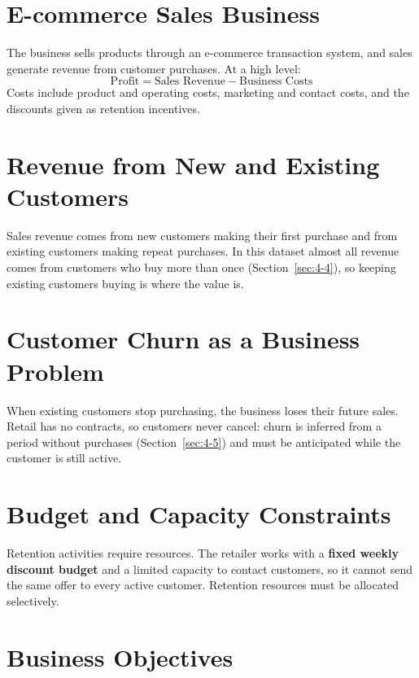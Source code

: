 \section{E-commerce Sales Business}
\label{sec:2-1}

The business sells products through an e-commerce transaction system, and sales generate revenue from customer purchases. At a high level:
\begin{equation*}
    \text{Profit} = \text{Sales Revenue} - \text{Business Costs}
\end{equation*}
Costs include product and operating costs, marketing and contact costs, and the discounts given as retention incentives.

\section{Revenue from New and Existing Customers}
\label{sec:2-2}

Sales revenue comes from new customers making their first purchase and from existing customers making repeat purchases. In this dataset almost all revenue comes from customers who buy more than once (Section~\ref{sec:4-4}), so keeping existing customers buying is where the value is.

\section{Customer Churn as a Business Problem}
\label{sec:2-3}

When existing customers stop purchasing, the business loses their future sales. Retail has no contracts, so customers never cancel: churn is inferred from a period without purchases (Section~\ref{sec:4-5}) and must be anticipated while the customer is still active.

\section{Budget and Capacity Constraints}
\label{sec:2-4}

Retention activities require resources. The retailer works with a \textbf{fixed weekly discount budget} and a limited capacity to contact customers, so it cannot send the same offer to every active customer. Retention resources must be allocated selectively.

\section{Business Objectives}
\label{sec:2-5}

